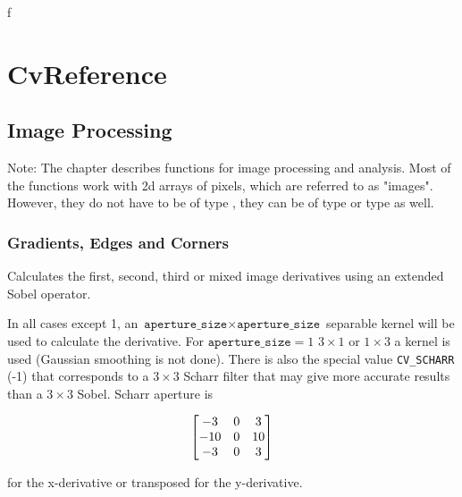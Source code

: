 f\chapter{CvReference}
\section{Image Processing}

Note: The chapter describes functions for image processing and
analysis. Most of the functions work with 2d arrays of pixels, which are referred
to as "images". However, they do not have to be of type
, they can be of type  or type  as well.

\subsection{Gradients, Edges and Corners}

\label{Sobel}
\label{Sobel}
Calculates the first, second, third or mixed image derivatives using an extended Sobel operator.

\begin{description}
\end{description}

In all cases except 1, an $\texttt{aperture\_size} \times
\texttt{aperture\_size}$ separable kernel will be used to calculate the
derivative. For $\texttt{aperture\_size} = 1$ $ 3 \times 1$ or $ 1 \times 3$
a kernel is used (Gaussian smoothing is not done). There is also the special
value \texttt{CV\_SCHARR} (-1) that corresponds to a $3\times3$ Scharr
filter that may give more accurate results than a $3\times3$ Sobel. Scharr
aperture is

\[ \begin{bmatrix} -3 & 0 & 3\\ -10 & 0 & 10\\ -3 & 0 & 3 \end{bmatrix}
\]

for the x-derivative or transposed for the y-derivative.

